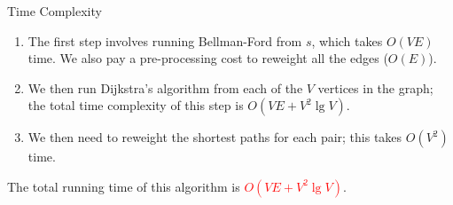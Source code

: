 \documentclass{beamer}
\begin{document}
\begin{frame}{Time Complexity}
    \begin{enumerate}
        \item The ﬁrst step involves running Bellman-Ford from $s$, which takes $O(VE)$ time.  We also pay a pre-processing cost to reweight all the edges ($O(E)$). \pause
        \item We then run Dijkstra's algorithm from each of the $V$ vertices in the graph; the total time complexity of this step is $O(VE + V^2 \lg V)$. \pause
        \item We then need to reweight the shortest paths for each pair; this takes $O(V^2)$ time. \pause
    \end{enumerate}
    The total running time of this algorithm is \textcolor{red}{$O(VE + V^2 \lg V)$}.
\end{frame}

























\begin{frame}{}
\end{frame}


\end{document}

